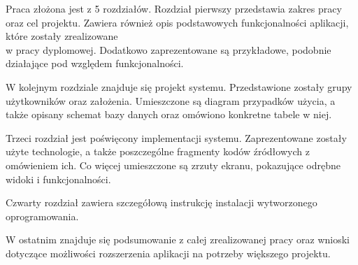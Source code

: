 \documentclass[10pt,titlepage]{article}
\begin{document}
\par Praca złożona jest z 5 rozdziałów. Rozdział pierwszy przedstawia zakres pracy oraz cel projektu. Zawiera również opis podstawowych funkcjonalności aplikacji, które zostały zrealizowane\\ w pracy dyplomowej. Dodatkowo zaprezentowane są przykładowe, podobnie działające pod względem funkcjonalności.
\par W kolejnym rozdziale znajduje się projekt systemu. Przedstawione zostały grupy użytkowników oraz założenia. Umieszczone są diagram przypadków użycia, a także opisany schemat bazy danych oraz omówiono konkretne tabele w niej.
\par Trzeci rozdział jest poświęcony implementacji systemu. Zaprezentowane zostały użyte technologie, a także poszczególne fragmenty kodów źródłowych z omówieniem ich. Co więcej umieszczone są zrzuty ekranu, pokazujące odrębne widoki i funkcjonalności.
\par Czwarty rozdział zawiera szczegółową instrukcję instalacji wytworzonego oprogramowania.
\par W ostatnim znajduje się podsumowanie z całej zrealizowanej pracy oraz wnioski dotyczące możliwości rozszerzenia aplikacji na potrzeby większego projektu.
\end{document}
